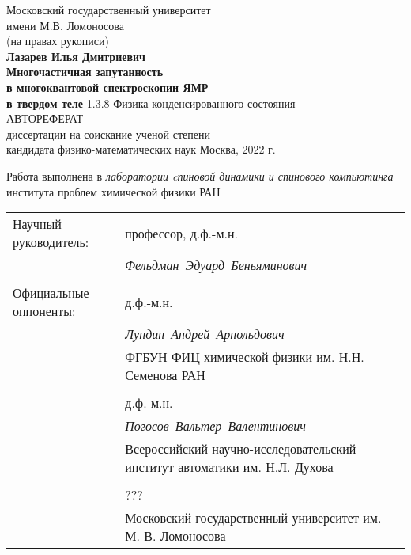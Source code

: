 \begin{titlepage}
\vfill
\begin{center}
  {\large
    Московский государственный университет \\
    имени М.В. Ломоносова
  } \\
  \vfill
  (на правах рукописи) \\
  \vfill
  {\Large \bf Лазарев Илья Дмитриевич} \\
  \vspace{1cm}
  {\Large \bf
      Многочастичная запутанность \\
      в многоквантовой спектроскопии ЯМР \\
      \vspace{2mm}
      в твердом теле
  }
 \vfill
  1.3.8 Физика конденсированного состояния \\
 \vspace{1cm}
 АВТОРЕФЕРАТ \\
 диссертации на соискание ученой степени \\
 кандидата физико-математических наук
 \vfill
 Москва, 2022 г.
\end{center}
\end{titlepage}

Работа выполнена в \textit{лаборатории cпиновой динамики и спинового компьютинга} института проблем химической физики РАН

\vfill

\begin{tabularx}{\textwidth}{
  >{\raggedright\arraybackslash}X
  >{\raggedright\arraybackslash}X
}%
Научный руководитель: & профессор, д.ф.-м.н. \\
 & \mbox{\textit{Фельдман Эдуард Беньяминович}} \\
 & \\
Официальные оппоненты: &  д.ф.-м.н.\\
 & \mbox{\textit{Лундин Андрей Арнольдович}} \\
 & ФГБУН ФИЦ химической физики им. Н.Н. Семенова РАН \\
 & \\
 & д.ф.-м.н. \\
 & \mbox{\textit{Погосов Вальтер Валентинович}} \\
 & Всероссийский научно-исследовательский институт автоматики им. Н.Л. Духова \\
 & \\
 & ??? \\ 
 & Московский государственный университет им. М. В. Ломоносова
\end{tabularx}

